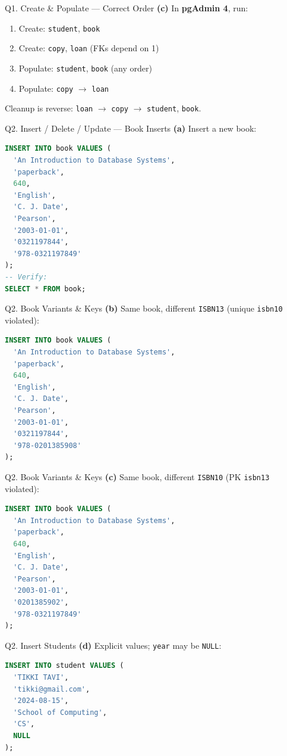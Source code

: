 \documentclass{beamer}
\begin{document}
\begin{frame}{Q1. Create \& Populate — Correct Order}
\textbf{(c)} In \textbf{pgAdmin 4}, run:
\begin{enumerate}
  \item Create: \texttt{student}, \texttt{book}
  \item Create: \texttt{copy}, \texttt{loan} (FKs depend on 1)
  \item Populate: \texttt{student}, \texttt{book} (any order)
  \item Populate: \texttt{copy} $\to$ \texttt{loan}
\end{enumerate}
Cleanup is reverse: \texttt{loan} $\to$ \texttt{copy} $\to$ \texttt{student}, \texttt{book}.
\end{frame}

\begin{frame}[fragile]{Q2. Insert / Delete / Update — Book Inserts}
\textbf{(a)} Insert a new book:
\begin{lstlisting}[language=SQL]
INSERT INTO book VALUES (
  'An Introduction to Database Systems',
  'paperback',
  640,
  'English',
  'C. J. Date',
  'Pearson',
  '2003-01-01',
  '0321197844',
  '978-0321197849'
);
-- Verify:
SELECT * FROM book;
\end{lstlisting}
\end{frame}

\begin{frame}[fragile]{Q2. Book Variants \& Keys}
\textbf{(b)} Same book, different \texttt{ISBN13} (unique \texttt{isbn10} violated):
\begin{lstlisting}[language=SQL]
INSERT INTO book VALUES (
  'An Introduction to Database Systems',
  'paperback',
  640,
  'English',
  'C. J. Date',
  'Pearson',
  '2003-01-01',
  '0321197844',
  '978-0201385908'
);
\end{lstlisting}
\end{frame}

\begin{frame}[fragile]{Q2. Book Variants \& Keys}
\textbf{(c)} Same book, different \texttt{ISBN10} (PK \texttt{isbn13} violated):
\begin{lstlisting}[language=SQL]
INSERT INTO book VALUES (
  'An Introduction to Database Systems',
  'paperback',
  640,
  'English',
  'C. J. Date',
  'Pearson',
  '2003-01-01',
  '0201385902',
  '978-0321197849'
);
\end{lstlisting}
\end{frame}

\begin{frame}[fragile]{Q2. Insert Students}
\textbf{(d)} Explicit values; \texttt{year} may be \texttt{NULL}:
\begin{lstlisting}[language=SQL]
INSERT INTO student VALUES (
  'TIKKI TAVI',
  'tikki@gmail.com',
  '2024-08-15',
  'School of Computing',
  'CS',
  NULL
);
\end{lstlisting}
\end{frame}
\end{document}

